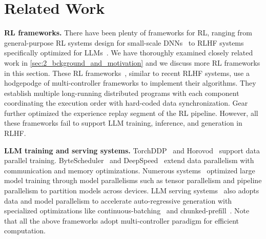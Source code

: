 \section{Related Work}
\noindent\textbf{RL frameworks.} 
There have been plenty of frameworks for RL, ranging from general-purpose RL systems design for small-scale DNNs~\cite{liang2018rllib, liang2021rllib, openaibaseline, coach, hafner2017tensorflowagents, PytorchRL} to RLHF systems specifically optimized for LLMs~\cite{yao2023deepspeedchat, hu23openrlhf, NeMoAligner, xiao2023adaptive, CollosalChat}. 
We have thoroughly examined closely related work in \textsection\ref{sec:2_bckground_and_motivation} and we discuss more RL frameworks in this section. These RL frameworks~\cite{openaibaseline, coach, hafner2017tensorflowagents, PytorchRL, wang2023gear}, similar to recent RLHF systems, use a hodgepodge of multi-controller frameworks to implement their algorithms. They establish multiple long-running distributed programs with each component coordinating the execution order with hard-coded data synchronization. Gear~\cite{wang2023gear} further optimized the experience replay segment of the RL pipeline. However, all these frameworks fail to support LLM training, inference, and generation in RLHF.






\noindent\textbf{LLM training and serving systems.}
TorchDDP~\cite{paszke2019pytorch} and Horovod~\cite{sergeev2018horovod} support data parallel training. ByteScheduler~\cite{pengGenericCommunicationScheduler2019} and DeepSpeed~\cite{rasley2020deepspeed} extend data parallelism with communication and memory optimizations. 
Numerous systems~\cite{shoeybi2019megatron, jiang2024megascale, lu2017flexflow, wang2019tofu, narayanan2021efficient, fan2021dapple, zhang2022accelerating} optimized large model training through model parallelisms such as tensor parallelism and pipeline parallelism to partition models across devices. 
LLM serving systems~\cite{kwon2023efficient, agrawal2023sarathi, zhongDistServeDisaggregatingPrefill2024, yu2022orca, nvidiaTensorRTLLM, song2023powerinfer} also adopts data and model parallelism to accelerate auto-regressive generation with specialized optimizations like continuous-batching~\cite{yu2022orca} and chunked-prefill~\cite{agrawal2023sarathi}.
Note that all the above frameworks adopt multi-controller paradigm for efficient computation.  



